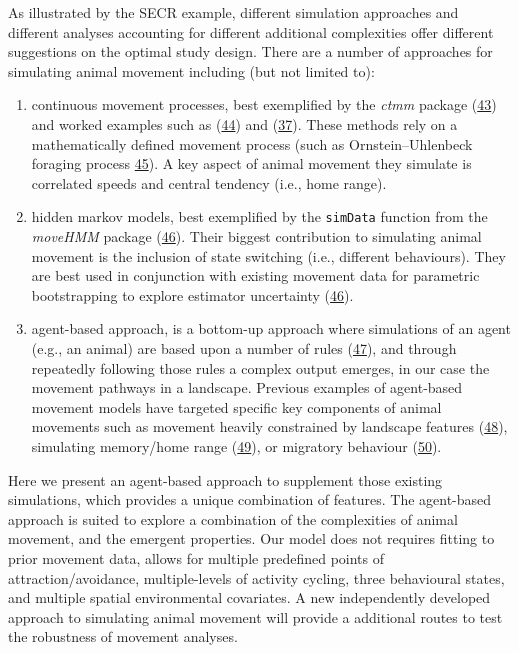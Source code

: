\documentclass[10pt,a4paper]{article}
\begin{document}
As illustrated by the SECR example, different simulation approaches and different analyses accounting for different additional complexities offer different suggestions on the optimal study design.
There are a number of approaches for simulating animal movement including (but not limited to):

\begin{enumerate}
\def\labelenumi{\arabic{enumi}.}
\item
  continuous movement processes, best exemplified by the \emph{ctmm} package (\protect\hyperlink{ref-Calabrese2016}{43}) and worked examples such as (\protect\hyperlink{ref-silva_autocorrelationinformed_2022}{44}) and (\protect\hyperlink{ref-theng_confronting_2022}{37}).
  These methods rely on a mathematically defined movement process (such as Ornstein--Uhlenbeck foraging process \protect\hyperlink{ref-Fleming2014}{45}).
  A key aspect of animal movement they simulate is correlated speeds and central tendency (i.e., home range).
\item
  hidden markov models, best exemplified by the \texttt{simData} function from the \emph{moveHMM} package (\protect\hyperlink{ref-Michelot2016}{46}).
  Their biggest contribution to simulating animal movement is the inclusion of state switching (i.e., different behaviours).
  They are best used in conjunction with existing movement data for parametric bootstrapping to explore estimator uncertainty (\protect\hyperlink{ref-Michelot2016}{46}).
\item
  agent-based approach, is a bottom-up approach where simulations of an agent (e.g., an animal) are based upon a number of rules (\protect\hyperlink{ref-Tang2010}{47}), and through repeatedly following those rules a complex output emerges, in our case the movement pathways in a landscape.
  Previous examples of agent-based movement models have targeted specific key components of animal movements such as movement heavily constrained by landscape features (\protect\hyperlink{ref-quaglietta_simriv_2019}{48}), simulating memory/home range (\protect\hyperlink{ref-VanMoorter2009}{49}), or migratory behaviour (\protect\hyperlink{ref-bennett_modelling_2006}{50}).
\end{enumerate}

Here we present an agent-based approach to supplement those existing simulations, which provides a unique combination of features.
The agent-based approach is suited to explore a combination of the complexities of animal movement, and the emergent properties.
Our model does not requires fitting to prior movement data, allows for multiple predefined points of attraction/avoidance, multiple-levels of activity cycling, three behavioural states, and multiple spatial environmental covariates.
A new independently developed approach to simulating animal movement will provide a additional routes to test the robustness of movement analyses.
\end{document}

